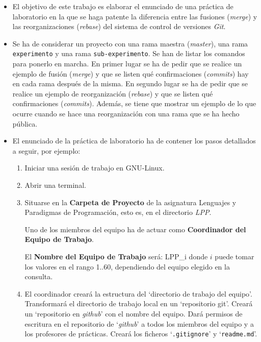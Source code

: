 \documentclass[spanish,a4paper,11pt]{article}
\begin{document}
\begin{itemize}
\item
El objetivo de este trabajo es elaborar el enunciado de una práctica de laboratorio
en la que se haga patente la diferencia entre las fusiones (\textit{merge}) y 
las reorganizaciones (\textit{rebase}) del sistema de control de versiones \textit{Git}.

\item
Se ha de considerar un proyecto con una rama maestra (\textit{master}), 
una rama \texttt{experimento} y una rama \texttt{sub-experimento}.
Se han de listar los comandos para ponerlo en marcha.
%
En primer lugar se ha de pedir que se realice un ejemplo de fusión (\textit{merge}) 
y que se listen qué confirmaciones (\textit{commits}) hay en cada rama después de la misma.
%
En segundo lugar se ha de pedir que se realice un ejemplo de reorganización (\textit{rebase})
y que se listen qué confirmaciones (\textit{commits}).
%
Además, se tiene que mostrar un ejemplo de lo que ocurre cuando se hace una reorganización
con una rama que se ha hecho pública.


\item
El enunciado de la práctica de laboratorio ha de contener los pasos detallados a seguir, por ejemplo:


\begin{enumerate}
\item
 Iniciar una sesión de trabajo en GNU-Linux.

\item
 Abrir una terminal.

\item
 Situarse en la \textbf{Carpeta de Proyecto} de la asignatura
 Lenguajes y Paradigmas de Programación, esto es, en el directorio \textit{LPP}.

 Uno de los miembros del equipo ha de actuar como \textbf{Coordinador del Equipo de Trabajo}.

 El \textbf{Nombre del Equipo de Trabajo} será: \textsc{LPP}{\_i}
 donde $i$  puede tomar los valores en el rango 1..60, dependiendo del equipo elegido en la consulta.

\item
El coordinador creará la estructura del `directorio de trabajo del equipo'.
%
Transformará el directorio de trabajo local en un `repositorio git'.
%
Creará un `repositorio en \textit{github}' con el nombre del equipo.
%
Dará permisos de escritura en el repositorio de `\textit{github}' a todos los miembros del equipo y a los profesores de prácticas.
%
Creará los ficheros `\verb|.gitignore|' y `\verb|readme.md|'.


\end{enumerate}
\end{itemize}
\end{document}
